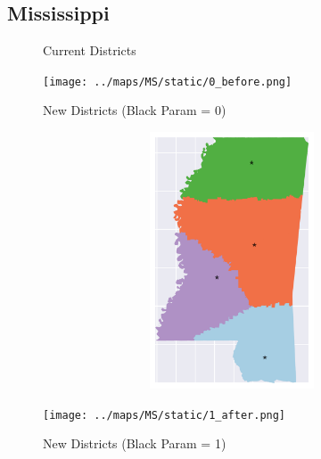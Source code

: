 \subsection{Mississippi}
\begin{figure}[htb!] \centering
\caption{ Current Districts }
\texttt{[image: ../maps/MS/static/0\_before.png]}
\caption{ New Districts (Black Param = 0) }
\includegraphics[width=5in,height=3in,keepaspectratio]{../maps/MS/static/0_after.png}
\caption{ New Districts (Black Param = 1) }
\texttt{[image: ../maps/MS/static/1\_after.png]}
\end{figure}

\clearpage
\newpage

